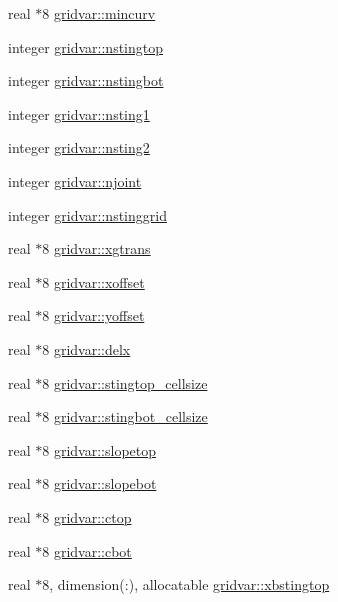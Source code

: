 \begin{DoxyCompactItemize}
\item 
real $\ast$8 \hyperlink{namespacegridvar_a6fe39b1ddaaf457d61c6458b903a961f}{gridvar\+::mincurv}
\item 
integer \hyperlink{namespacegridvar_a7e34959aea544968408485c12ae2ec2d}{gridvar\+::nstingtop}
\item 
integer \hyperlink{namespacegridvar_aa2e254a9039742bb411848f9e96a4257}{gridvar\+::nstingbot}
\item 
integer \hyperlink{namespacegridvar_a1a9d890d3962056407f065bee6fd2739}{gridvar\+::nsting1}
\item 
integer \hyperlink{namespacegridvar_ad662ce2bebfd96b4b3220629dbb0b5b6}{gridvar\+::nsting2}
\item 
integer \hyperlink{namespacegridvar_ad3dfef715cafcf310b1a7c5a297d162c}{gridvar\+::njoint}
\item 
integer \hyperlink{namespacegridvar_ae3d6123e7025443a7d76ea994104734f}{gridvar\+::nstinggrid}
\item 
real $\ast$8 \hyperlink{namespacegridvar_a0a1d150b576fa8e1243bb1aa8ab04fa0}{gridvar\+::xgtrans}
\item 
real $\ast$8 \hyperlink{namespacegridvar_a31d3c65a0c90f341f558413f1f4386a6}{gridvar\+::xoffset}
\item 
real $\ast$8 \hyperlink{namespacegridvar_af659082800429edb283c62f245146f28}{gridvar\+::yoffset}
\item 
real $\ast$8 \hyperlink{namespacegridvar_a4e437e8bc140d7b17868d060514b7d59}{gridvar\+::delx}
\item 
real $\ast$8 \hyperlink{namespacegridvar_a6da2f560ec3e950efa0855d27d01fe86}{gridvar\+::stingtop\+\_\+cellsize}
\item 
real $\ast$8 \hyperlink{namespacegridvar_aa8b31ebbf73c3df1aa56e327142bcab5}{gridvar\+::stingbot\+\_\+cellsize}
\item 
real $\ast$8 \hyperlink{namespacegridvar_a0325ce2437768ded8f8819e05a341433}{gridvar\+::slopetop}
\item 
real $\ast$8 \hyperlink{namespacegridvar_a241785fa73202eb4a891ece68ffa4fd1}{gridvar\+::slopebot}
\item 
real $\ast$8 \hyperlink{namespacegridvar_a6ab302a8157787da35aa4bef702ce7db}{gridvar\+::ctop}
\item 
real $\ast$8 \hyperlink{namespacegridvar_a4dbed8798130fc3925a584d911eb397b}{gridvar\+::cbot}
\item 
real $\ast$8, dimension(\+:), allocatable \hyperlink{namespacegridvar_a679d95eb858c82d2409d67d8c7defa5b}{gridvar\+::xbstingtop}

\end{DoxyCompactItemize}
